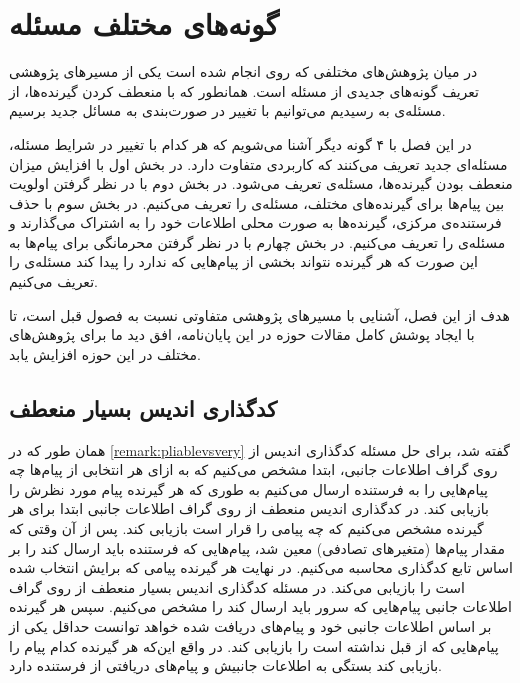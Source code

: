 \chapter{گونه‌های مختلف مسئله}
\label{chapter:varients}
در میان پژوهش‌های مختلفی که روی 
\picod
انجام شده است یکی از مسیرهای پژوهشی تعریف گونه‌های جدیدی از مسئله است. همانطور که با منعطف کردن گیرنده‌ها، از مسئله‌ی
\icod
به
\picod
رسیدیم می‌توانیم با تغییر در صورت‌بندی
\picod
به مسائل جدید برسیم.

در این فصل با ۴ گونه دیگر آشنا می‌شویم که هر کدام با تغییر در شرایط مسئله، مسئله‌ای جدید تعریف می‌کنند که کاربردی متفاوت دارد. در بخش اول با افزایش میزان منعطف بودن گیرنده‌ها، مسئله‌ی 
 تعریف می‌شود. در بخش دوم با در نظر گرفتن اولویت بین پیام‌ها برای گیرنده‌های مختلف، مسئله‌ی
 را تعریف می‌کنیم. در بخش سوم با حذف فرستنده‌ی مرکزی، گیرنده‌ها به صورت محلی اطلاعات خود را به اشتراک می‌گذارند و مسئله‌ی
 را تعریف می‌کنیم. در بخش چهارم با در نظر گرفتن محرمانگی برای پیام‌ها به این صورت که هر گیرنده نتواند بخشی از پیام‌هایی که ندارد را پیدا کند مسئله‌ی
 را تعریف می‌کنیم.
 
 هدف از این فصل، آشنایی با مسیرهای پژوهشی متفاوتی نسبت به فصول قبل است، تا با ایجاد پوشش کامل مقالات حوزه
 \picod
 در این پایان‌نامه، افق دید ما برای پژوهش‌های مختلف در این حوزه افزایش یابد.
 \pagebreak
\section{کدگذاری اندیس بسیار منعطف}
\label{sec:verypliable}
همان طور که در
\autoref{remark:pliablevsvery}
گفته شد، برای حل مسئله کدگذاری اندیس از روی گراف اطلاعات جانبی، ابتدا مشخص می‌کنیم که به ازای هر انتخابی از پیام‌ها چه پیام‌هایی را به فرستنده ارسال می‌کنیم به طوری که هر گیرنده پیام مورد نظرش را بازیابی کند. در کدگذاری اندیس منعطف از روی گراف اطلاعات جانبی ابتدا برای هر گیرنده مشخص می‌کنیم که چه پیامی را قرار است بازیابی کند.
پس از آن وقتی که مقدار پیام‌ها (متغیرهای تصادفی) معین شد، پیام‌هایی که فرستنده باید ارسال کند را بر اساس تابع کدگذاری محاسبه می‌کنیم. در نهایت هر گیرنده پیامی که برایش انتخاب شده است را بازیابی می‌کند.
در مسئله کدگذاری اندیس بسیار منعطف از روی گراف اطلاعات جانبی پیام‌هایی که سرور باید ارسال کند را مشخص می‌کنیم. سپس هر گیرنده بر اساس اطلاعات جانبی خود و پیام‌های دریافت شده خواهد توانست حداقل یکی از پیام‌هایی که از قبل نداشته است را بازیابی کند. در واقع این‌که هر گیرنده کدام پیام را بازیابی کند بستگی به اطلاعات جانبیش و پیام‌های دریافتی از فرستنده دارد.


